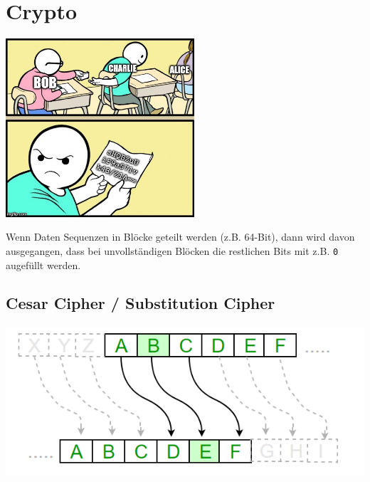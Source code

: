 \documentclass[
  10pt,
  a4paper,
]{article}
\renewcommand*\contentsname{Inhaltsverzeichnis}
\newcommand\contentsname{Inhaltsverzeichnis}
\begin{document}
\begin{multicols*}{2}
\renewcommand*\contentsname{Inhaltsverzeichnis}
{
\hypersetup{linkcolor=}
\setcounter{tocdepth}{3}
\tableofcontents
}
\newpage

\section{Crypto}\label{crypto}

\includegraphics[width=7cm,height=\textheight]{images/crypto_meme.jpg}

\begin{tcolorbox}[enhanced jigsaw, coltitle=black, toprule=.15mm, colframe=quarto-callout-note-color-frame, breakable, titlerule=0mm, title=\textcolor{quarto-callout-note-color}{\faInfo}\hspace{0.5em}{Hinweis}, toptitle=1mm, colback=white, leftrule=.75mm, bottomtitle=1mm, colbacktitle=quarto-callout-note-color!10!white, left=2mm, bottomrule=.15mm, rightrule=.15mm, arc=.35mm, opacityback=0, opacitybacktitle=0.6]

Wenn Daten Sequenzen in Blöcke geteilt werden (z.B. 64-Bit), dann wird
davon ausgegangen, dass bei unvollständigen Blöcken die restlichen Bits
mit z.B. \texttt{0} augefüllt werden.

\end{tcolorbox}

\subsection{Cesar Cipher / Substitution
Cipher}\label{cesar-cipher-substitution-cipher}

\includegraphics{images/crypto/ceaserCipher.png}


\end{multicols*}
\end{document}
